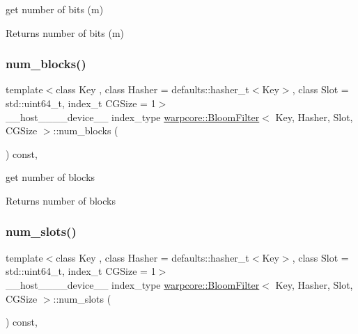 get number of bits (m) 

\begin{DoxyReturn}{Returns}
number of bits (m) 
\end{DoxyReturn}
\mbox{\label{classwarpcore_1_1BloomFilter_a10fcbb540441eff40a1d0fccd1b992bd}} 
\subsubsection{\texorpdfstring{num\+\_\+blocks()}{num\_blocks()}}
{\footnotesize\ttfamily template$<$class Key , class Hasher  = defaults\+::hasher\+\_\+t$<$\+Key$>$, class Slot  = std\+::uint64\+\_\+t, index\+\_\+t C\+G\+Size = 1$>$ \\
\+\_\+\+\_\+host\+\_\+\+\_\+\+\_\+\+\_\+device\+\_\+\+\_\+ index\+\_\+type \hyperlink{classwarpcore_1_1BloomFilter}{warpcore\+::\+Bloom\+Filter}$<$ Key, Hasher, Slot, C\+G\+Size $>$\+::num\+\_\+blocks (\begin{DoxyParamCaption}{ }\end{DoxyParamCaption}) const\hspace{0.3cm}{\ttfamily [inline]}, {\ttfamily [noexcept]}}



get number of blocks 

\begin{DoxyReturn}{Returns}
number of blocks 
\end{DoxyReturn}
\mbox{\label{classwarpcore_1_1BloomFilter_a1ab7ecd7bcc3f6321a252f94d63965eb}} 
\subsubsection{\texorpdfstring{num\+\_\+slots()}{num\_slots()}}
{\footnotesize\ttfamily template$<$class Key , class Hasher  = defaults\+::hasher\+\_\+t$<$\+Key$>$, class Slot  = std\+::uint64\+\_\+t, index\+\_\+t C\+G\+Size = 1$>$ \\
\+\_\+\+\_\+host\+\_\+\+\_\+\+\_\+\+\_\+device\+\_\+\+\_\+ index\+\_\+type \hyperlink{classwarpcore_1_1BloomFilter}{warpcore\+::\+Bloom\+Filter}$<$ Key, Hasher, Slot, C\+G\+Size $>$\+::num\+\_\+slots (\begin{DoxyParamCaption}{ }\end{DoxyParamCaption}) const\hspace{0.3cm}{\ttfamily [inline]}, {\ttfamily [noexcept]}}



